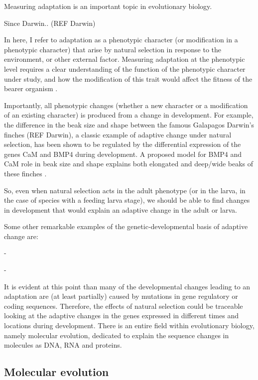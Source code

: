 Measuring adaptation is an important topic in evolutionary biology.

Since Darwin.. (REF Darwin)

In here, I refer to adaptation as a phenotypic character (or modification in a phenotypic character) that arise by natural selection in response to the environment, or other external factor.
Measuring adaptation at the phenotypic level requires a clear understanding of the function of the phenotypic character under study, and how the modification of this trait would affect the fitness of the bearer organism 
	\citep{EmiliaSantos2015}. 

Importantly, all phenotypic changes (whether a new character or a modification of an existing character) is produced from a change in development.
For example, the difference in the beak size and shape between the famous Galapagos Darwin's finches (REF Darwin), a classic example of adaptive change under natural selection, has been shown to be regulated by the differential expression of the genes CaM 
and BMP4 
during development. A proposed model for BMP4 and CaM role in beak size and shape explains both elongated and deep/wide beaks of these finches
	\citep{Abzhanov2006}.

So, even when natural selection acts in the adult phenotype (or in the larva, in the case of species with a feeding larva stage), we should be able to find changes in development that would explain an adaptive change in the adult or larva.


Some other remarkable examples of the genetic-developmental basis of adaptive change are:

-

-

It is evident at this point than many of the developmental changes leading to an adaptation are (at least partially) caused by mutations in gene regulatory or coding sequences.
Therefore, the effects of natural selection could be traceable looking at the adaptive changes in the genes expressed in different times and locations during development. There is an entire field within evolutionary biology, namely molecular evolution, dedicated to explain the sequence changes in molecules as DNA,
RNA 
and proteins. 


\subsection{Molecular evolution}

